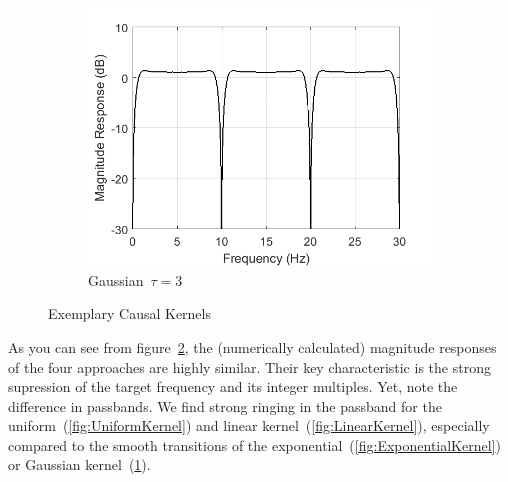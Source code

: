 \documentclass[a4paper]{article}
\begin{document}
\begin{figure}[hbtp]
\begin{subfigure}{.245\textwidth}
        \includegraphics[width=\textwidth]{img/causal/mag_gauss.png}
        \caption{Gaussian~$\tau=3$}\label{fig:GaussKernel}
    \end{subfigure}
    \caption{Exemplary Causal Kernels}\label{fig:ExemplaryCausalKernels}
\end{figure}

As you can see from figure~\ref{fig:ExemplaryCausalKernels}, the (numerically calculated) magnitude responses of the four approaches are highly similar. Their key characteristic is the strong supression of the target frequency and its integer multiples.
Yet, note the difference in passbands. We find strong ringing in the passband for the uniform~(\ref{fig:UniformKernel}) and linear kernel~(\ref{fig:LinearKernel}), especially compared to the smooth transitions of the exponential~(\ref{fig:ExponentialKernel}) or Gaussian kernel~(\ref{fig:GaussKernel}).
\end{document}
